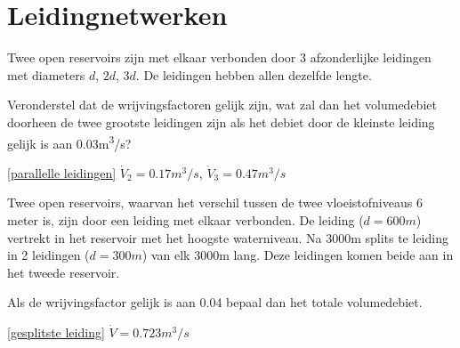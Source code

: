 \chapter{Leidingnetwerken}
\label{sec:Leidingnetwerken}
\begin{toepassing}
	\label{parallelle leidingen}
Twee open reservoirs zijn met elkaar verbonden door 3 afzonderlijke leidingen met diameters $d$, $2d$, $3d$. De leidingen hebben allen dezelfde lengte.
		
Veronderstel dat de wrijvingsfactoren gelijk zijn, wat zal dan het volumedebiet doorheen de twee grootste leidingen zijn als het debiet door de kleinste leiding gelijk is aan 0.03\unit{m^3/s}? 
\end{toepassing}
\begin{antwoord}{\ref{parallelle leidingen}}
	$\dot{V}_2 = 0.17\unit{m^3/s}$, $\dot{V}_3 = 0.47\unit{m^3/s}$
\end{antwoord}
\begin{toepassing}[*]
	\label{gesplitste leiding}
Twee open reservoirs, waarvan het verschil tussen de twee vloeistofniveaus 6 meter is, zijn door een leiding met elkaar verbonden. De leiding ($d=600\unit{m}$) vertrekt in het reservoir met het hoogste waterniveau. Na 3000m splits te leiding in 2 leidingen ($d=300\unit{m}$) van elk 3000m lang. Deze leidingen komen beide aan in het tweede reservoir. 
		
Als de wrijvingsfactor gelijk is aan 0.04 bepaal dan het totale volumedebiet. 
\end{toepassing}
\begin{antwoord}{\ref{gesplitste leiding}}
		$\dot{V} = 0.723\unit{m^3/s}$
\end{antwoord}

